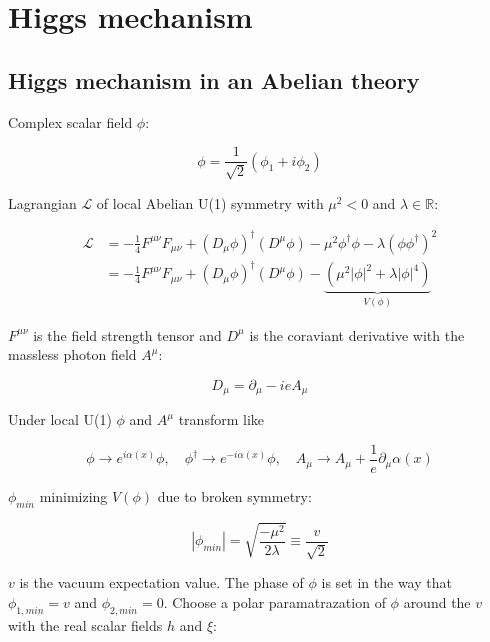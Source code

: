 \documentclass[12pt,oneside]{book}
\begin{document}
\chapter*{Higgs mechanism}

\section*{Higgs mechanism in an Abelian theory}

Complex scalar field $\phi$: 

\begin{equation}
    \phi = \frac{1}{\sqrt{2}}(\phi_1 + i\phi_2)
\end{equation}

Lagrangian $\mathcal{L}$ of local Abelian U(1) symmetry with $\mu^2 < 0$ and $\lambda \in \mathbb{R}$: 

\begin{align}
    \mathcal{L} &= -\frac{1}{4}F^{\mu\nu}F_{\mu\nu} + (D_{\mu} \phi)^{\dagger}(D^{\mu} \phi) - \mu^2\phi^{\dagger}\phi - \lambda(\phi\phi^{\dagger})^2 \\
                &= -\frac{1}{4}F^{\mu\nu}F_{\mu\nu} + (D_{\mu} \phi)^{\dagger}(D^{\mu} \phi) - \underbrace{(\mu^2|\phi|^2 + \lambda|\phi|^4)}_{V(\phi)} \nonumber
\end{align}


$F^{\mu\nu}$ is the field strength tensor and $D^\mu$ is the coraviant derivative with the massless photon field $A^\mu$:

\begin{equation}
    D_\mu = \partial_\mu - ieA_\mu
\end{equation}

Under local U(1) $\phi$ and $A^\mu$ transform like

\begin{equation}
    \phi \to e^{i\alpha(x)}\phi, \quad \phi^{\dagger} \to e^{-i\alpha(x)}\phi, \quad A_\mu \to A_\mu + \frac{1}{e}\partial_\mu{\alpha(x)}
\end{equation}

$\phi_{min}$ minimizing $V(\phi)$ due to broken symmetry:

\begin{equation}
   |\phi_{min}| = \sqrt{\frac{-\mu^2}{2\lambda}} \equiv \frac{v}{\sqrt{2}}
\end{equation}

$v$ is the vacuum expectation value. The phase of $\phi$ is set in the way that $\phi_{1, min} = v$ and $\phi_{2, min} = 0$. Choose a polar paramatrazation of $\phi$ around the $v$ with the real scalar fields $h$ and $\xi$:
\end{document}
